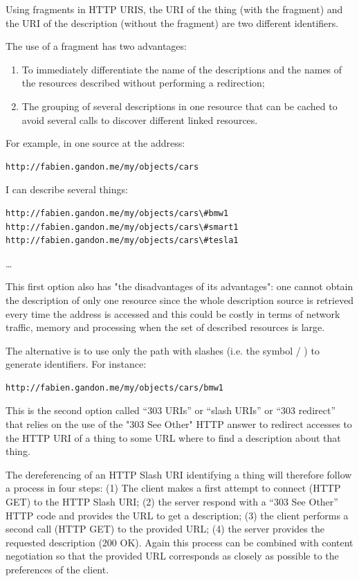 Using fragments in HTTP URIS, the URI of the thing (with the fragment)
and the URI of the description (without the fragment) are two different
identifiers.

The use of a fragment has two advantages:

\begin{enumerate}
\def\labelenumi{\arabic{enumi}.}
\item
  To immediately differentiate the name of the descriptions and the
  names of the resources described without performing a redirection;
\item
  The grouping of several descriptions in one resource that can be
  cached to avoid several calls to discover different linked resources.
\end{enumerate}

For example, in one source at the address:

\begin{lstlisting}
http://fabien.gandon.me/my/objects/cars
\end{lstlisting}


I can describe several things:


\begin{lstlisting}
http://fabien.gandon.me/my/objects/cars\#bmw1
http://fabien.gandon.me/my/objects/cars\#smart1
http://fabien.gandon.me/my/objects/cars\#tesla1
\end{lstlisting}
\ldots{} 



This first option also has "the disadvantages of its advantages": one
cannot obtain the description of only one resource since the whole
description source is retrieved every time the address is accessed and
this could be costly in terms of network traffic, memory and processing
when the set of described resources is large.

The alternative is to use only the path with slashes (i.e. the symbol /
) to generate identifiers. For instance:

\begin{lstlisting}
http://fabien.gandon.me/my/objects/cars/bmw1
\end{lstlisting}


This is the second option called ``303 URIs'' or ``slash URIs'' or ``303
redirect'' that relies on the use of the "303 See Other" HTTP answer to
redirect accesses to the HTTP URI of a thing to some URL where to find a
description about that thing.

The dereferencing of an HTTP Slash URI identifying a thing will
therefore follow a process in four steps: (1) The client makes a first
attempt to connect (HTTP GET) to the HTTP Slash URI; (2) the server
respond with a ``303 See Other'' HTTP code and provides the URL to get a
description; (3) the client performs a second call (HTTP GET) to the
provided URL; (4) the server provides the requested description (200
OK). Again this process can be combined with content negotiation so that
the provided URL corresponds as closely as possible to the preferences
of the client.

